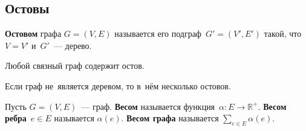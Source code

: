 \subsection{Остовы}
\textbf{Остовом} графа $G = (V, E)$ называется его подграф~$G' = (V', E')$ такой, что $V = V'$ и~$G'$~--- дерево.

\begin{statement}
Любой связный граф содержит остов.
\end{statement}

\begin{statement}
Если граф не~является деревом, то в~нём несколько остовов.
\end{statement}

Пусть $G = (V, E)$~--- граф.
\textbf{Весом} называется функция~$\alpha \colon E \to \mathbb R^+$.
\textbf{Весом ребра}~$e \in E$ называется $\alpha(e)$.
\textbf{Весом графа} называется $\displaystyle \sum_{e \in E} \alpha(e)$.

